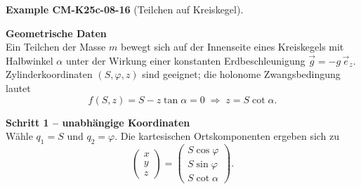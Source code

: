 \documentclass[10pt, letterpaper]{article}
\newcommand{\CustomHeading}[3]{%
  \par\medskip\noindent%
  \textbf{#1 #2} \textnormal{(#3)}.\enskip%
}
\newenvironment{EXA}[2]{\CustomHeading{Example}{#1}{#2}}{}
\begin{document}
\begin{EXA}{CM-K25c-08-16}{Teilchen auf Kreiskegel}
\begin{center}
\end{center}

\textbf{Geometrische Daten}\\
Ein Teilchen der Masse $m$ bewegt sich auf der Innenseite eines
Kreiskegels mit Halbwinkel $\alpha$ unter der Wirkung einer konstanten
Erdbeschleunigung $\vec g = -g\,\vec e_z$.  
Zylinderkoordinaten $(S,\varphi,z)$ sind geeignet; die
holonome Zwangsbedingung lautet
\[
  f(S,z)=S-z\tan\alpha=0
  \;\Longrightarrow\;
  z = S\cot\alpha .
\]

\textbf{Schritt 1 – unabhängige Koordinaten}\\
Wähle $q_1=S$ und $q_2=\varphi$.
Die kartesischen Orts­komponenten ergeben sich zu
\[
  \begin{pmatrix} x \\ y \\ z \end{pmatrix} =
  \begin{pmatrix}
    S\cos\varphi \\[2pt]
    S\sin\varphi \\[2pt]
    S\cot\alpha
  \end{pmatrix}.
\]


\end{EXA}
\end{document}
